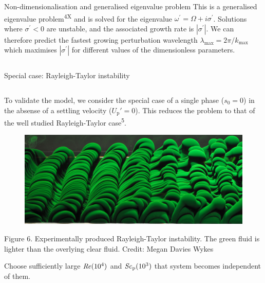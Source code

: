 \documentclass[final]{beamer} %
\newcommand\Rey{\mbox{\textit{Re}}}  %
\newcommand\Sc{\mbox{\textit{Sc}}}  %
\begin{document}
\begin{frame}[t]
\begin{columns}[t]
\begin{column}{0.6\paperwidth}
\begin{block}{Non-dimensionalisation and generalised eigenvalue problem}
        \centering This is a generalised eigenvalue problem\textsuperscript{4X} and is solved for the eigenvalue $\omega^{\prime} = \Omega + i \sigma^{\prime}$. Solutions where $\sigma^{\prime} < 0$ are unstable, and the associated growth rate is $|\sigma^{\prime}|$. We can therefore predict the fastest growing perturbation wavelength $\lambda_{\text{max}} = 2 \pi / k_{\text{max}}$ which maximises $|\sigma^{\prime}|$ for different values of the dimensionless parameters. 
      \end{block}

    \end{column}

  \end{columns}

  \begin{block}{Special case: Rayleigh-Taylor instability}
    \begin{columns}[t]
      \begin{column}{0.3\paperwidth}
        \centering To validate the model, we consider the special case of a single phase ($s_{0} = 0$) in the absense of a settling velocity ($U_{\text{p}}' = 0$). This reduces the problem to that of the well studied Rayleigh-Taylor case\textsuperscript{5}. 

        \begin{figure}
            \includegraphics[width=0.3\paperwidth]{Megan.jpg}
        \end{figure}

        \vspace{-0.5cm}

        \centering \footnotesize Figure 6. Experimentally produced Rayleigh-Taylor instability. The green fluid is lighter than the overlying clear fluid. Credit: Megan Davies Wykes

        \vspace{0.5cm}

        \normalsize Choose sufficiently large $\Rey (10^{4})$ and $\Sc_{\text{p}} (10^{3})$ that system becomes independent of them. \\


\end{column}
\end{columns}
\end{block}
\end{frame}
\end{document}
